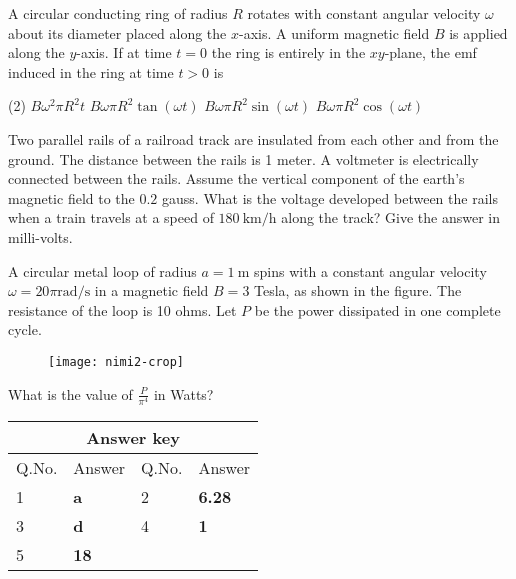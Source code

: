 \begin{enumerate}
\begin{minipage}{\textwidth}
	\item A circular conducting ring of radius $R$ rotates with constant angular velocity $\omega$ about its diameter placed along the $x$-axis. A uniform magnetic field $B$ is applied along the $y$-axis. If at time $t=0$ the ring is entirely in the $x y$-plane, the emf induced in the ring at time $t>0$ is
\end{minipage}
\begin{tasks}(2)
	\task[\textbf{A.}] $B \omega^{2} \pi R^{2} t$
	\task[\textbf{B.}]$B \omega \pi R^{2} \tan (\omega t)$
	\task[\textbf{C.}]$B \omega \pi R^{2} \sin (\omega t)$
	\task[\textbf{D.}]$B \omega \pi R^{2} \cos (\omega t)$
\end{tasks}
\begin{minipage}{\textwidth}
	\item Two parallel rails of a railroad track are insulated from each other and from the ground. The distance between the rails is 1 meter. A voltmeter is electrically connected between the rails. Assume the vertical component of the earth's magnetic field to the $0.2$ gauss. What is the voltage developed between the rails when a train travels at a speed of $180 \mathrm{~km} / \mathrm{h}$ along the track? Give the answer in milli-volts.
\end{minipage}
\begin{minipage}{\textwidth}
	\item A circular metal loop of radius $a=1 \mathrm{~m}$ spins with a constant angular velocity $\omega=20 \pi \mathrm{rad} / \mathrm{s}$ in a magnetic field $B=3$ Tesla, as shown in the figure. The resistance of the loop is 10 ohms. Let $P$ be the power dissipated in one complete cycle.
\begin{figure}[H]
	\centering
	\texttt{[image: nimi2-crop]}
\end{figure}
	 What is the value of $\frac{P}{\pi^{4}}$ in Watts?
\end{minipage}
\end{enumerate}
\setlength\arrayrulewidth{1pt}
\begin{table}[H]
	\centering
	
	\begin{tabular}{|p{1.5cm}|p{1.5cm}||p{1.5cm}|p{1.5cm}|}
		\hline
		\multicolumn{4}{|c|}{\textbf{Answer key}}\\\hline\hline
		\rowcolor{ocrel}Q.No.&Answer&Q.No.&Answer\\\hline
		1&\textbf{a}&2&\textbf{6.28}\\\hline
		3&\textbf{d}&4&\textbf{1}\\\hline
		5&\textbf{18}&&\\\hline
	\end{tabular}
\end{table}
